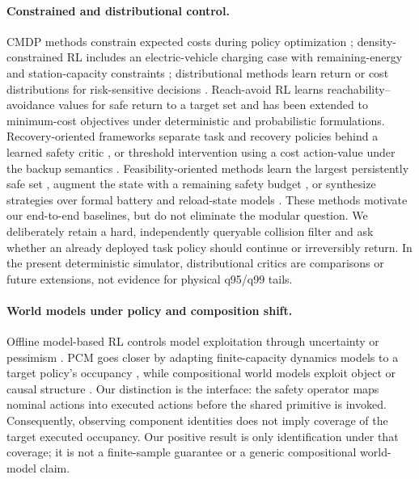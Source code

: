 \paragraph{Constrained and distributional control.}
CMDP methods constrain expected costs during policy optimization \citep{achiam2017cpo,liu2022cvpo}; density-constrained RL includes an electric-vehicle charging case with remaining-energy and station-capacity constraints \citep{qin2021density}; distributional methods learn return or cost distributions for risk-sensitive decisions \citep{bellemare2017distributional,dabney2018iqn,yang2019fqf,kim2023sdac}. Reach-avoid RL learns reachability--avoidance values for safe return to a target set \citep{hsu2021reachavoid} and has been extended to minimum-cost objectives under deterministic \citep{so2024rcppo} and probabilistic \citep{pan2026rapcpo} formulations. Recovery-oriented frameworks separate task and recovery policies behind a learned safety critic \citep{thananjeyan2021recovery}, or threshold intervention using a cost action-value under the backup semantics \citep{wagener2021sailr}. Feasibility-oriented methods learn the largest persistently safe set \citep{yu2022rcrl}, augment the state with a remaining safety budget \citep{sootla2022saute}, or synthesize strategies over formal battery and reload-state models \citep{blahoudek2020consumption}. These methods motivate our end-to-end baselines, but do not eliminate the modular question. We deliberately retain a hard, independently queryable collision filter and ask whether an already deployed task policy should continue or irreversibly return. In the present deterministic simulator, distributional critics are comparisons or future extensions, not evidence for physical q95/q99 tails.

\paragraph{World models under policy and composition shift.}
Offline model-based RL controls model exploitation through uncertainty or pessimism \citep{yu2020mopo,kidambi2020morel,yu2021combo}. PCM goes closer by adapting finite-capacity dynamics models to a target policy's occupancy \citep{chen2024pcm}, while compositional world models exploit object or causal structure \citep{zhao2022howm,wang2025wm3c}. Our distinction is the interface: the safety operator maps nominal actions into executed actions before the shared primitive is invoked. Consequently, observing component identities does not imply coverage of the target executed occupancy. Our positive result is only identification under that coverage; it is not a finite-sample guarantee or a generic compositional world-model claim.

